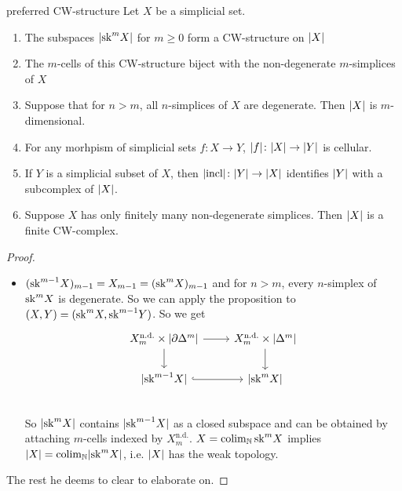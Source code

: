 \documentclass[language=english]{TemplateLecture}
\begin{document}
\begin{thm}{preferred CW-structure}{}
    Let \(X\) be a simplicial set.
    \begin{enumerate}
        \item The subspaces \(\lvert\mathrm{sk}^m X\rvert\) for \(m \geq 0\) form a CW-structure on \(\lvert X\rvert\)
        \item The \(m\)-cells of this CW-structure biject with the non-degenerate \(m\)-simplices of \(X\)
        \item Suppose that for \(n > m\), all \(n\)-simplices of \(X\) are degenerate. Then \(\lvert X\rvert\) is \(m\)-dimensional.
        \item For any morhpism of simplicial sets \(f\colon X \to Y\), \(\lvert f\rvert\colon \lvert X\rvert\to \lvert Y\rvert\) is cellular.
        \item If \(Y\) is a simplicial subset of \(X\), then \(\lvert\operatorname{incl}\rvert\colon \lvert Y\rvert\to \lvert X\rvert\) identifies \(\lvert Y\rvert\) with a subcomplex of \(\lvert X\rvert\).
        \item Suppose \(X\) has only finitely many non-degenerate simplices. Then \(\lvert X\rvert\) is a finite CW-complex.
    \end{enumerate}
\end{thm}

\begin{proof}\leavevmode
    \begin{itemize}
        \item[1. + 2.] \((\mathrm{sk}^{m-1} X)_{m-1} = X_{m-1} = (\mathrm{sk}^m X)_{m-1}\) and for \(n > m\), every \(n\)-simplex of \(\mathrm{sk}^m X\) is degenerate. So we can apply the proposition to \((X,Y) = (\mathrm{sk}^m X, \mathrm{sk}^{m-1} Y)\). So we get
        \[\begin{tikzcd}
            X_m^{\text{n.d.}} \times \abs{\partial\Delta^m} \ar[r]\ar[d] & X_m^{\text{n.d.}} \times \abs{\Delta^m} \ar[d] \\
            \abs{\sk^{m-1}X}\ar[r, hook] & \abs{\sk^m X} \\
        \end{tikzcd}\]
        So \(\lvert\mathrm{sk}^m X\rvert\) contains \(\lvert\mathrm{sk}^{m-1} X\rvert\) as a closed subspace and can be obtained by attaching \(m\)-cells indexed by \(X_m^{\text{n.d.}}\).
        \(X = \operatorname*{\mathrm{colim}}_{\mathbb{N}} \mathrm{sk}^m X\) implies \(\lvert X\rvert = \operatorname*{\mathrm{colim}}_{\mathbb{N}} \lvert\mathrm{sk}^m X\rvert\), i.e. \(\lvert X\rvert\) has the weak topology.
    \end{itemize}
    The rest he deems to clear to elaborate on.
\end{proof}


\end{document}
